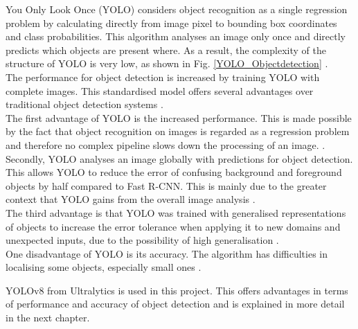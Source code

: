 {	\glqq You Only Look Once\grqq{} (YOLO) considers object recognition as a single regression problem by calculating directly from image pixel to bounding box coordinates and class probabilities. This algorithm analyses an image only once and directly predicts which objects are present where. As a result, the complexity of the structure of YOLO is very low, as shown in Fig. \ref{YOLO_Objectdetection} \citep{Redmon2016}. \\
	The performance for object detection is increased by training YOLO with complete images. This standardised model offers several advantages over traditional object detection systems \citep{Redmon2016}. \\
	The first advantage of YOLO is the increased performance. This is made possible by the fact that object recognition on images is regarded as a regression problem and therefore no complex pipeline slows down the processing of an image.  \citep{Redmon2016}. 
	Secondly, YOLO analyses an image globally with predictions for object detection. This allows YOLO to reduce the error of confusing background and foreground objects by half compared to Fast R-CNN. This is mainly due to the greater context that YOLO gains from the overall image analysis \citep{Redmon2016}. \\
	The third advantage is that YOLO was trained with generalised representations of objects to increase the error tolerance when applying it to new domains and unexpected inputs, due to the possibility of high generalisation \citep{Redmon2016}. \\
	One disadvantage of YOLO is its accuracy. The algorithm has difficulties in localising some objects, especially small ones \citep{Redmon2016}. 

	YOLOv8 from Ultralytics is used in this project. This offers advantages in terms of performance and accuracy of object detection and is explained in more detail in the next chapter. 
	} 

